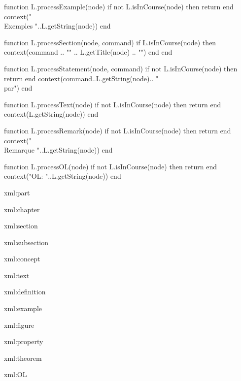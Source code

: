 function L.processExample(node)
  if not L.isInCourse(node) then return end
  context("\\Exemples "..L.getString(node))
end



function L.processSection(node, command)
  if L.isInCourse(node) then 
    context(command .. "{" .. L.getTitle(node) .. "}")  	
  end
end

function L.processStatement(node, command)
  if not L.isInCourse(node) then return end
  context(command..L.getString(node).. "\\par")
end



function L.processText(node)
  if not L.isInCourse(node) then return end
  context(L.getString(node))
end

function L.processRemark(node)
  if not L.isInCourse(node) then return end
  context("\\Remarque "..L.getString(node))
end

function L.processOL(node)
  if not L.isInCourse(node) then return end
  context("OL: "..L.getString(node))
end
\stopluacode 



\startxmlsetups xml:part
\stopxmlsetups 

\def\isOfCourse#1{}

\def\getIndex#1{[[\xmlatt{#1}{i}]]}
\def\getProgram#1{[[\xmlatt{#1}{p}]]}
\def\getTitle#1{[[\xmlatt{#1}{t}]]}

\startxmlsetups xml:chapter
%
\stopxmlsetups

\startxmlsetups xml:section
%
\stopxmlsetups

\startxmlsetups xml:subsection
%
\stopxmlsetups

\startxmlsetups xml:concept
%
\stopxmlsetups

\startxmlsetups xml:text
%
\stopxmlsetups 

\startxmlsetups xml:definition
%
\stopxmlsetups

\startxmlsetups xml:example
%
\stopxmlsetups

\startxmlsetups xml:figure
%
\stopxmlsetups

\startxmlsetups xml:property
%
\stopxmlsetups

\startxmlsetups xml:theorem
%
\stopxmlsetups

\startxmlsetups xml:OL
%
\stopxmlsetups

\def\setupCourse#1{\ctxlua{L.setCourse("#1")}}

\protect
\stopenvironment
